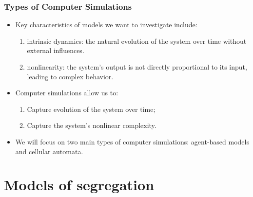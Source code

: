 \documentclass[aspectratio=169]{beamer}
\begin{document}
\begin{frame}
   \frametitle{Types of Computer Simulations}

   \begin{itemize}
      \item Key characteristics of models we want to investigate include:
      \begin{enumerate}
         \item intrinsic dynamics: the natural evolution of the system over time without external influences.
         \item nonlinearity: the system's output is not directly proportional to its input, leading to complex behavior.
      \end{enumerate}
      \item Computer simulations allow us to:
      \begin{enumerate}
         \item Capture evolution of the system over time;
         \item Capture the system's nonlinear complexity.
      \end{enumerate}
      \item We will focus on two main types of computer simulations: agent-based models and cellular automata.
   \end{itemize}
\end{frame}

\section[Models of segregation]{Models of segregation}
\end{document}
